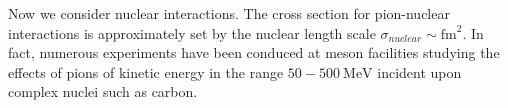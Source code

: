 \documentclass[11 pt, preprint,preprintnumbers,amsmath,amssymb, prd]{revtex4}
\begin{document}
Now we consider nuclear interactions. The cross section for pion-nuclear interactions is approximately set by the nuclear length scale $\sigma_{nuclear} \sim \text{fm}^2$. In fact, numerous experiments have been conduced at meson facilities studying the effects of pions of kinetic energy in the range $50 - 500 ~\text{MeV}$ incident upon complex nuclei such as carbon. 
\end{document}
